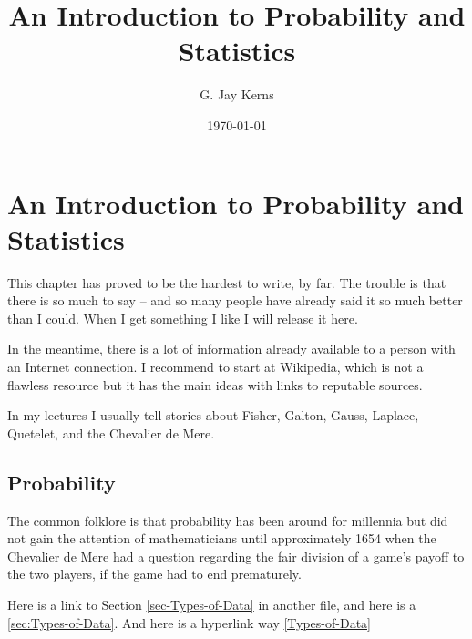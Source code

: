 \documentclass{scrbook}
\title{An Introduction to Probability and Statistics}
\author{G. Jay Kerns}
\date{\today}
\begin{document}
\maketitle



\chapter{An Introduction to Probability and Statistics}
\label{sec-1}


\noindent 
This chapter has proved to be the hardest to write, by far. The trouble is that there is so much to say -- and so many people have already said it so much better than I could. When I get something I like I will release it here.

In the meantime, there is a lot of information already available to a person with an Internet connection. I recommend to start at Wikipedia, which is not a flawless resource but it has the main ideas with links to reputable sources.

In my lectures I usually tell stories about Fisher, Galton, Gauss, Laplace, Quetelet, and the Chevalier de Mere.
\section{Probability}
\label{sec-1-1}


The common folklore is that probability has been around for millennia but did not gain the attention of mathematicians until approximately 1654 when the Chevalier de Mere had a question regarding the fair division of a game's payoff to the two players, if the game had to end prematurely.

Here is a link to Section \ref{sec-Types-of-Data} in another file, and here is a \ref{sec:Types-of-Data}.  And here is a hyperlink way \ref{Types-of-Data}
\end{document}
